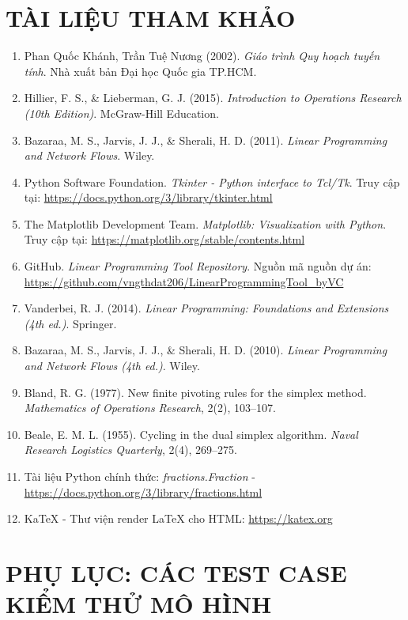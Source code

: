 \documentclass[12pt,a4paper]{article}
\begin{document}
\section*{TÀI LIỆU THAM KHẢO}
\begin{enumerate}
    \item Phan Quốc Khánh, Trần Tuệ Nương (2002). \textit{Giáo trình Quy hoạch tuyến tính}. Nhà xuất bản Đại học Quốc gia TP.HCM.
    \item Hillier, F. S., \& Lieberman, G. J. (2015). \textit{Introduction to Operations Research (10th Edition)}. McGraw-Hill Education. 
    \item Bazaraa, M. S., Jarvis, J. J., \& Sherali, H. D. (2011). \textit{Linear Programming and Network Flows}. Wiley. 
    \item Python Software Foundation. \textit{Tkinter - Python interface to Tcl/Tk}. Truy cập tại: \url{https://docs.python.org/3/library/tkinter.html}
    \item The Matplotlib Development Team. \textit{Matplotlib: Visualization with Python}. Truy cập tại: \url{https://matplotlib.org/stable/contents.html}
    \item GitHub. \textit{Linear Programming Tool Repository}. Nguồn mã nguồn dự án: \url{https://github.com/vngthdat206/LinearProgrammingTool_byVC}
    \item Vanderbei, R. J. (2014). \textit{Linear Programming: Foundations and Extensions (4th ed.)}. Springer.
    \item Bazaraa, M. S., Jarvis, J. J., \& Sherali, H. D. (2010). \textit{Linear Programming and Network Flows (4th ed.)}. Wiley.
    \item Bland, R. G. (1977). New finite pivoting rules for the simplex method. \textit{Mathematics of Operations Research}, 2(2), 103–107.
    \item Beale, E. M. L. (1955). Cycling in the dual simplex algorithm. \textit{Naval Research Logistics Quarterly}, 2(4), 269–275.
    \item Tài liệu Python chính thức: \textit{fractions.Fraction} - \url{https://docs.python.org/3/library/fractions.html}
    \item KaTeX - Thư viện render LaTeX cho HTML: \url{https://katex.org}
\end{enumerate}


\newpage
{}
\section*{PHỤ LỤC: CÁC TEST CASE KIỂM THỬ MÔ HÌNH}
\end{document}
